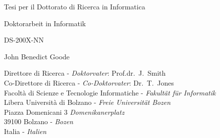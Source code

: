 {%
\clearpage
\par\vskip 2cm
\begin{center}
\printtitle
\par\vspace {6cm}
{\large \sc Tesi per il Dottorato di Ricerca in Informatica}
\par\vspace {1cm}
{\large \sc Doktorarbeit in Informatik}
\par\vspace {2cm}
{\large DS-200X-NN}
\par \vspace {5cm} %
{\Large John Benedict Goode}                        %
\par\vspace {1cm} %
\end{center}

\clearpage
\noindent%
Direttore di Ricerca - \textit{Doktorvater}: Prof.dr.\ J.~Smith\\                      %
Co-Direttore di Ricerca - \textit{Co-Doktorvater}: Dr.\ T.~Jones\\                        %
Facolt\`{a} di Scienze e Tecnologie Informatiche - \textit{Fakult\"{a}t f\"{u}r Informatik}\\ %
Libera Universit\`{a} di Bolzano - \textit{Freie Universit\"{a}t Bozen}\\ %
Piazza Domenicani 3 \textit{Domenikanerplatz} \\
39100 Bolzano - \textit{Bozen} \\
Italia - \textit{Italien}

}
